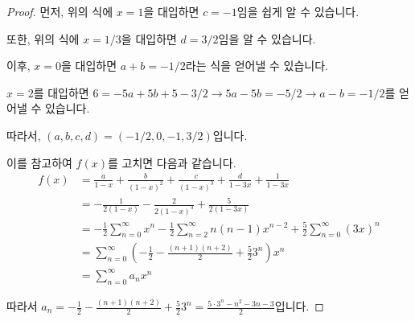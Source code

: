 \documentclass[a4paper, 12pt]{article}
\begin{document}
\begin{proof}
먼저, 위의 식에 $x=1$을 대입하면 $c=-1$임을 쉽게 알 수 있습니다.

또한, 위의 식에 $x=1/3$을 대입하면 $d=3/2$임을 알 수 있습니다.

이후, $x=0$을 대입하면 $a+b=-1/2$라는 식을 얻어낼 수 있습니다.

$x=2$를 대입하면 $6 = -5a + 5b + 5 - 3/2 \rightarrow 5a - 5b = -5/2 \rightarrow a-b = -1/2$를 얻어낼 수 있습니다.

따라서, $(a, b, c, d) = (-1/2, 0, -1, 3/2)$입니다.

이를 참고하여 $f(x)$를 고치면 다음과 같습니다.
\begin{align*}
    f(x) & = \frac{a}{1-x} + \frac{b}{(1-x)^2} + \frac{c}{(1-x)^3} + \frac{d}{1-3x} + \frac{1}{1-3x} \\
    & = - \frac{1}{2(1-x)} - \frac{2}{2(1-x)^3} + \frac{5}{2(1-3x)} \\
    & = - \frac{1}{2} \sum_{n=0}^{\infty} x^n - \frac{1}{2} \sum_{n=2}^{\infty} n(n-1) x^{n-2} + \frac{5}{2} \sum_{n=0}^{\infty} (3x)^n \\
    & = \sum_{n=0}^{\infty} \left( - \frac{1}{2} - \frac{(n+1)(n+2)}{2} + \frac{5}{2}3^n \right) x^n \\
    & = \sum_{n=0}^{\infty} a_n x^n
\end{align*}

따라서 $\displaystyle a_n = - \frac{1}{2} - \frac{(n+1)(n+2)}{2} + \frac{5}{2}3^n = \frac{5\cdot3^n - n^2 - 3n - 3}{2}$입니다.
\end{proof}
\end{document}
